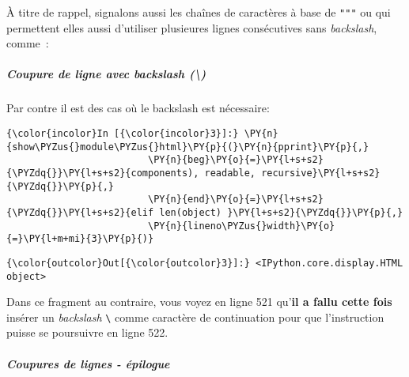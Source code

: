     À titre de rappel, signalons aussi les chaînes de caractères à base de
\texttt{"""} ou
\texttt{\textquotesingle{}\textquotesingle{}\textquotesingle{}} qui
permettent elles aussi d'utiliser plusieures lignes consécutives sans
\emph{backslash}, comme~:

\begin{Shaded}
\begin{Highlighting}[frame=lines,framerule=0.6mm,rulecolor=\color{asisframecolor}]
\OperatorTok{=} 
\end{Highlighting}
\end{Shaded}

    \hypertarget{coupure-de-ligne-avec-backslash}{%
\subparagraph{\texorpdfstring{Coupure de ligne avec \emph{backslash}
(\textbackslash{})}{Coupure de ligne avec backslash (\textbackslash{})}}\label{coupure-de-ligne-avec-backslash}}

    Par contre il est des cas où le backslash est nécessaire:

    \begin{Verbatim}[commandchars=\\\{\},frame=single,framerule=0.3mm,rulecolor=\color{cellframecolor}]
{\color{incolor}In [{\color{incolor}3}]:} \PY{n}{show\PYZus{}module\PYZus{}html}\PY{p}{(}\PY{n}{pprint}\PY{p}{,} 
                         \PY{n}{beg}\PY{o}{=}\PY{l+s+s2}{\PYZdq{}}\PY{l+s+s2}{components), readable, recursive}\PY{l+s+s2}{\PYZdq{}}\PY{p}{,} 
                         \PY{n}{end}\PY{o}{=}\PY{l+s+s2}{\PYZdq{}}\PY{l+s+s2}{elif len(object) }\PY{l+s+s2}{\PYZdq{}}\PY{p}{,} 
                         \PY{n}{lineno\PYZus{}width}\PY{o}{=}\PY{l+m+mi}{3}\PY{p}{)}
\end{Verbatim}


\begin{Verbatim}[commandchars=\\\{\},frame=single,framerule=0.3mm,rulecolor=\color{cellframecolor}]
{\color{outcolor}Out[{\color{outcolor}3}]:} <IPython.core.display.HTML object>
\end{Verbatim}
            
    Dans ce fragment au contraire, vous voyez en ligne 521 qu'\textbf{il a
fallu cette fois} insérer un \emph{backslash} \texttt{\textbackslash{}}
comme caractère de continuation pour que l'instruction puisse se
poursuivre en ligne 522.

    \hypertarget{coupures-de-lignes---uxe9pilogue}{%
\subparagraph{Coupures de lignes -
épilogue}\label{coupures-de-lignes---uxe9pilogue}}

